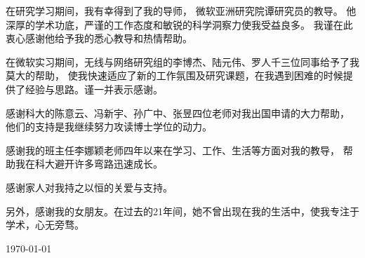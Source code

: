 \begin{acknowledgements}

在研究学习期间，我有幸得到了我的导师，
微软亚洲研究院谭研究员的教导。
他深厚的学术功底，严谨的工作态度和敏锐的科学洞察力使我受益良多。
我谨在此衷心感谢他给予我的悉心教导和热情帮助。

在微软实习期间，无线与网络研究组的李博杰、陆元伟、罗人千三位同事给予了我莫大的帮助，
使我快速适应了新的工作氛围及研究课题，在我遇到困难的时候提供了经验与思路。谨一并表示感谢。

感谢科大的陈意云、冯新宇、孙广中、张昱四位老师对我出国申请的大力帮助，
他们的支持是我继续努力攻读博士学位的动力。

感谢我的班主任李娜颖老师四年以来在学习、工作、生活等方面对我的教导，
帮助我在科大避开许多弯路迅速成长。

感谢家人对我持之以恒的关爱与支持。

另外，感谢我的女朋友。在过去的21年间，她不曾出现在我的生活中，使我专注于学术，心无旁骛。

\bigskip
\rightline\today

\end{acknowledgements}
